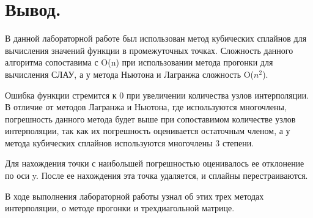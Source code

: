 \documentclass[11pt, a4paper]{article}
\begin{document}
\section{Вывод.}

В данной лабораторной работе был использован метод кубических сплайнов для вычисления значений
функции в промежуточных точках. Сложность данного алгоритма сопоставима с O(n) при использовании 
метода прогонки для вычисления СЛАУ, а у метода Ньютона и Лагранжа сложность O($n^2$).
 
\medskip\noindent
Ошибка функции стремится к 0 при увеличении количества узлов интерполяции. В отличие от методов
Лагранжа и Ньютона, где используются многочлены, погрешность данного метода будет выше при
сопоставимом количестве узлов интерполяции, так как их погрешность оценивается остаточным членом,
а у метода кубических сплайнов используются многочлены 3 степени.

\medskip\noindent
Для нахождения точки с наибольшей погрешностью оценивалось ее отклонение по оси y. После ее
нахождения эта точка удаляется, и сплайны перестраиваются.

\bigskip\noindent
В ходе выполнения лабораторной работы узнал об этих трех методах интерполяции, о методе прогонки и
трехдиагольной матрице.
\end{document}
